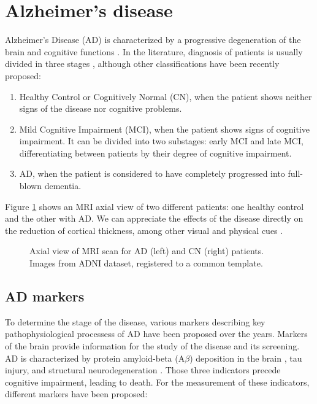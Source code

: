 \section{Alzheimer's disease}

Alzheimer's Disease (AD) is characterized by a progressive degeneration of the brain and cognitive functions \cite{Lane2018}. In the literature, diagnosis of patients is usually divided in three stages \cite{Brookmeyer2007}, although other classifications have been recently proposed:

\begin{enumerate}\itemsep5pt
\item Healthy Control or Cognitively Normal (CN), when the patient shows neither signs of the disease nor cognitive problems.
\item Mild Cognitive Impairment (MCI), when the patient shows signs of cognitive impairment. It can be divided into two substages: early MCI and late MCI, differentiating between patients by their degree of cognitive impairment.
\item AD, when the patient is considered to have completely progressed into full-blown dementia.
\end{enumerate}

Figure \ref{appendix:figAD} shows an MRI axial view of two different patients: one healthy control and the other with AD. We can appreciate the effects of the disease directly on the reduction of cortical thickness, among other visual and physical cues \cite{Schmidt1992}. \\

\begin{figure}[htbp]
  \centering
  \caption{Axial view of MRI scan for AD (left) and CN (right) patients. Images from ADNI dataset, registered to a common template.}
  \label{appendix:figAD}
\end{figure}

\subsection{AD markers} 

To determine the stage of the disease, various markers describing key pathophysiological processess of AD have been proposed over the years. Markers of the brain provide information for the study of the disease and its screening. AD is characterized by protein amyloid-beta (A$\beta$) deposition in the brain \cite{Rissman2012}, tau injury, and structural neurodegeneration \cite{Jack2013}. Those three indicators precede cognitive impairment, leading to death. For the measurement of these indicators, different markers have been proposed:

